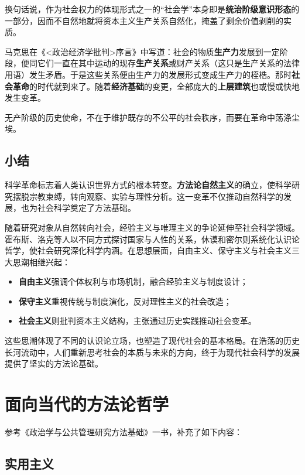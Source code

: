 换句话说，作为社会权力的体现形式之一的“社会学”本身即是\textbf{统治阶级意识形态}的一部分，因而不自然地就将资本主义生产关系自然化，掩盖了剩余价值剥削的实质。

马克思在《\textless 政治经济学批判\textgreater 序言》中写道：社会的物质\textbf{生产力}发展到一定阶段，便同它们一直在其中运动的现存\textbf{生产关系}或财产关系（这只是生产关系的法律用语）发生矛盾。于是这些关系便由生产力的发展形式变成生产力的桎梏。那时\textbf{社会革命}的时代就到来了。随着\textbf{经济基础}的变更，全部庞大的\textbf{上层建筑}也或慢或快地发生变革。\textsuperscript{\cite{11}}

无产阶级的历史使命，不在于维护既存的不公平的社会秩序，而要在革命中荡涤尘埃。

\subsection{小结}

科学革命标志着人类认识世界方式的根本转变。\textbf{方法论自然主义}的确立，使科学研究摆脱宗教束缚，转向观察、实验与理性分析。这一变革不仅推动自然科学的发展，也为社会科学奠定了方法基础。

随着研究对象从自然转向社会，经验主义与唯理主义的争论延伸至社会科学领域。霍布斯、洛克等人以不同方式探讨国家与人性的关系，休谟和密尔则系统化认识论哲学，使社会研究深化科学内涵。在思想层面，自由主义、保守主义与社会主义三大思潮相继兴起：

\begin{itemize}
    \item \textbf{自由主义}强调个体权利与市场机制，融合经验主义与制度设计；
    \item \textbf{保守主义}重视传统与制度演化，反对理性主义的社会改造；
    \item \textbf{社会主义}则批判资本主义结构，主张通过历史实践推动社会变革。
\end{itemize}

这些思潮体现了不同的认识论立场，也塑造了现代社会的基本格局。在浩荡的历史长河流动中，人们重新思考社会的本质与未来的方向，终于为现代社会科学的发展提供了坚实的方法论基础。

\section{面向当代的方法论哲学}

参考《政治学与公共管理研究方法基础》一书，补充了如下内容：\textsuperscript{\cite{12}}

\subsection{实用主义}

